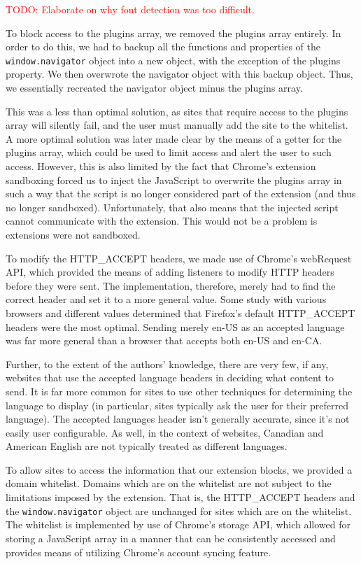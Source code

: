 \documentclass[12pt,a4paper]{article}
\begin{document}
\textcolor{red}{TODO: Elaborate on why font detection was too difficult.}

To block access to the plugins array, we removed the plugins array entirely. In order to do this, we had to backup all the functions and properties of the \texttt{window.navigator} object into a new object, with the exception of the plugins property. We then overwrote the navigator object with this backup object. Thus, we essentially recreated the navigator object minus the plugins array.

This was a less than optimal solution, as sites that require access to the plugins array will silently fail, and the user must manually add the site to the whitelist. A more optimal solution was later made clear by the means of a getter for the plugins array, which could be used to limit access and alert the user to such access. However, this is also limited by the fact that Chrome's extension sandboxing forced us to inject the JavaScript to overwrite the plugins array in such a way that the script is no longer considered part of the extension (and thus no longer sandboxed). Unfortunately, that also means that the injected script cannot communicate with the extension. This would not be a problem is extensions were not sandboxed.

To modify the HTTP\_ACCEPT headers, we made use of Chrome's webRequest API\cite{webrequest}, which provided the means of adding listeners to modify HTTP headers before they were sent. The implementation, therefore, merely had to find the correct header and set it to a more general value. Some study with various browsers and different values determined that Firefox's default HTTP\_ACCEPT headers were the most optimal. Sending merely en-US as an accepted language was far more general than a browser that accepts both en-US and en-CA.

Further, to the extent of the authors' knowledge, there are very few, if any, websites that use the accepted language headers in deciding what content to send. It is far more common for sites to use other techniques for determining the language to display (in particular, sites typically ask the user for their preferred language). The accepted languages header isn't generally accurate, since it's not easily user configurable. As well, in the context of websites, Canadian and American English are not typically treated as different languages.

To allow sites to access the information that our extension blocks, we provided a domain whitelist. Domains which are on the whitelist are not subject to the limitations imposed by the extension. That is, the HTTP\_ACCEPT headers and the \texttt{window.navigator} object are unchanged for sites which are on the whitelist. The whitelist is implemented by use of Chrome's storage API\cite{storage}, which allowed for storing a JavaScript array in a manner that can be consistently accessed and provides means of utilizing Chrome's account syncing feature.
\end{document}
